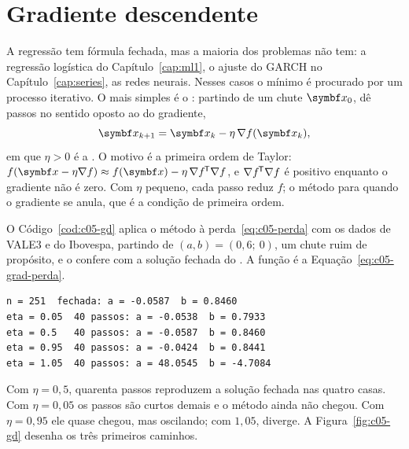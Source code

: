\section{Gradiente descendente}
\label{sec:c05-gradiente-descendente}

A regressão tem fórmula fechada, mas a maioria dos problemas não tem: a regressão logística do Capítulo~\ref{cap:ml1}, o ajuste do GARCH no Capítulo~\ref{cap:series}, as redes neurais. Nesses casos o mínimo é procurado por um processo iterativo. O mais simples é o : partindo de um chute $\vetor{x}_0$, dê passos no sentido oposto ao do gradiente,
\begin{equation}
  \vetor{x}_{k+1} = \vetor{x}_k - \eta\,\nabla f(\vetor{x}_k) ,
  \label{eq:c05-gd}
\end{equation}
em que $\eta > 0$ é a . O motivo é a primeira ordem de Taylor: $f(\vetor{x} - \eta\nabla f) \approx f(\vetor{x}) - \eta\,\nabla f\T\nabla f$, e $\nabla f^{\mkern-1.5mu\mathsf{T}}\nabla f$ é positivo enquanto o gradiente não é zero. Com $\eta$ pequeno, cada passo reduz $f$; o método para quando o gradiente se anula, que é a condição de primeira ordem.

O Código~\ref{cod:c05-gd} aplica o método à perda~\eqref{eq:c05-perda} com os dados de VALE3 e do Ibovespa, partindo de $(a, b) = (0,6;\ 0)$, um chute ruim de propósito, e o confere com a solução fechada do . A função  é a Equação~\eqref{eq:c05-grad-perda}.


\begin{lstlisting}[style=saida]
n = 251  fechada: a = -0.0587  b = 0.8460
eta = 0.05  40 passos: a = -0.0538  b = 0.7933
eta = 0.5   40 passos: a = -0.0587  b = 0.8460
eta = 0.95  40 passos: a = -0.0424  b = 0.8441
eta = 1.05  40 passos: a = 48.0545  b = -4.7084
\end{lstlisting}

Com $\eta = 0,5$, quarenta passos reproduzem a solução fechada nas quatro casas. Com $\eta = 0,05$ os passos são curtos demais e o método ainda não chegou. Com $\eta = 0,95$ ele quase chegou, mas oscilando; com $1,05$, diverge. A Figura~\ref{fig:c05-gd} desenha os três primeiros caminhos.


